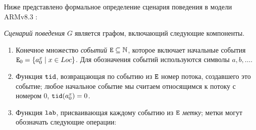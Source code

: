 Ниже представлено формальное определение сценария поведения в
модели ARMv8.3 \cite{Pulte-al:POPL18}:
\begin{definition}
\label{def:execution}
\emph{Сценарий поведения} $G$ является графом, включающий следующие компоненты.
\begin{enumerate}
\item Конечное множество \emph{событий} ${\mathtt{E}} \subseteq \mathbb{N}$, которое включает 
      начальные события ${\mathtt{E}}_0 = \{ a^x_0 \; | \; x \in Loc \}$.
      Для обозначения событий используются символы $a,b,\ldots$.
\item Функция ${\mathtt{tid}}$, возвращающая по событию из ${\mathtt{E}}$  номер потока, создавшего это событие; любое начальное событие мы считаем относящимся к потоку с номером 0,
      ${\mathtt{tid}}(a^x_0) = 0$.
\item Функция ${\mathtt{lab}}$, присваивающая каждому событию из ${\mathtt{E}}$ \emph{метку}; метки могут обозначать следующие операции: 
      

\end{enumerate}
\end{definition}
